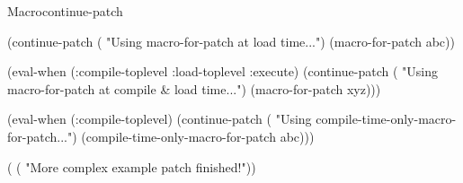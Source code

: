 \documentclass[10pt,twoside,english,pdftex]{article}
\begin{document}
\begin{functiondoc}{Macro}{continue-patch}{\superstar}
\begin{example}
  (continue-patch
   ( "Using macro-for-patch at load time...")
   (macro-for-patch abc))

  (eval-when (:compile-toplevel :load-toplevel :execute)
    (continue-patch
     ( "Using macro-for-patch at compile & load time...")
     (macro-for-patch xyz)))\goodpagebreak

  (eval-when (:compile-toplevel)
    (continue-patch
     ( "Using compile-time-only-macro-for-patch...")
     (compile-time-only-macro-for-patch abc)))

  (
   ( "More complex example patch finished!"))
\end{example}

\end{functiondoc}

\end{document}
